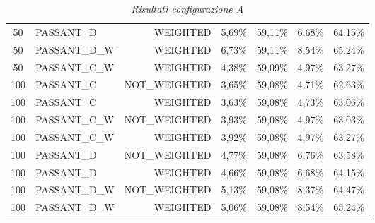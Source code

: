 \begin{table}[H]
{\begin{tabular}{ c l r c c c c }
		50 &  PASSANT\_D &   WEIGHTED &     5,69\% &    59,11\% &     6,68\% &    64,15\% \\
		
		50 & PASSANT\_D\_W &   WEIGHTED &     6,73\% &    59,11\% &     8,54\% &    65,24\% \\
		
		50 & PASSANT\_C\_W &   WEIGHTED &     4,38\% &    59,09\% &     4,97\% &    63,27\% \\
		
		100 &  PASSANT\_C & NOT\_WEIGHTED &     3,65\% &    59,08\% &     4,71\% &    62,63\% \\
		
		100 &  PASSANT\_C &   WEIGHTED &     3,63\% &    59,08\% &     4,73\% &    63,06\% \\
		
		100 & PASSANT\_C\_W & NOT\_WEIGHTED &     3,93\% &    59,08\% &     4,97\% &    63,03\% \\
		
		100 & PASSANT\_C\_W &   WEIGHTED &     3,92\% &    59,08\% &     4,97\% &    63,27\% \\
		
		100 &  PASSANT\_D & NOT\_WEIGHTED &     4,77\% &    59,08\% &     6,76\% &    63,58\% \\
		
		100 &  PASSANT\_D &   WEIGHTED &     4,66\% &    59,08\% &     6,68\% &    64,15\% \\
		
		100 & PASSANT\_D\_W & NOT\_WEIGHTED &     5,13\% &    59,08\% &     8,37\% &    64,47\% \\
		
		100 & PASSANT\_D\_W &   WEIGHTED &     5,06\% &    59,08\% &     8,54\% &    65,24\% \\
			\bottomrule
	\end{tabular}  
}
	\caption{\emph{Risultati configurazione A}}
\end{table}

